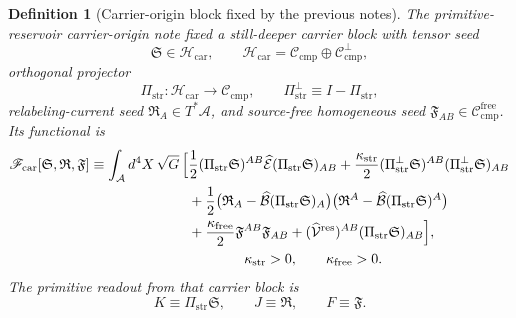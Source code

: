\documentclass[11pt]{article}
\newcommand{\Sub}{\mathcal A}
\newcommand{\ResidualLift}{\widehat{\mathcal V}^{\mathrm{res}}}
\newcommand{\SubEinLin}{\widehat{\mathcal E}}
\newcommand{\SubGaugeVec}{\widehat{\mathcal B}}
\newcommand{\CompClass}{\mathscr C_{\mathrm{cmp}}}
\newcommand{\CompFree}{\mathscr C_{\mathrm{cmp}}^{\mathrm{free}}}
\newcommand{\CarrierFunctional}{\mathscr F_{\mathrm{car}}}
\newcommand{\FreeStiff}{\kappa_{\mathrm{free}}}
\newcommand{\PrimStrain}{K}
\newcommand{\PrimNeutral}{J}
\newcommand{\PrimFree}{F}
\newcommand{\CarrierClass}{\mathscr H_{\mathrm{car}}}
\newcommand{\CarrierProj}{\Pi_{\mathrm{str}}}
\newcommand{\CarrierPerp}{\Pi_{\mathrm{str}}^{\perp}}
\newcommand{\CarrierGap}{\kappa_{\mathrm{str}}}
\newcommand{\CarrierSeed}{\mathfrak S}
\newcommand{\RelabelSeed}{\mathfrak R}
\newcommand{\FreeSeed}{\mathfrak F}
\newtheorem{definition}{Definition}
\begin{document}
\begin{definition}[Carrier-origin block fixed by the previous notes]
\label{def:carrier}
The primitive-reservoir carrier-origin note fixed a still-deeper carrier block with tensor seed
\[
\CarrierSeed\in\CarrierClass,
\qquad
\CarrierClass=\CompClass\oplus \CompClass^\perp,
\]
orthogonal projector
\[
\CarrierProj:\CarrierClass\to\CompClass,
\qquad
\CarrierPerp\equiv I-\CarrierProj,
\]
relabeling-current seed \(\RelabelSeed_A\in T^*\Sub\), and source-free homogeneous seed \(\FreeSeed_{AB}\in\CompFree\). Its functional is
\begin{equation}
\begin{aligned}
\CarrierFunctional[\CarrierSeed,\RelabelSeed,\FreeSeed]
\equiv
\int_{\Sub} d^4X\,\sqrt{G}\,
\Bigl[
&\frac12 (\CarrierProj\CarrierSeed)^{AB}
\SubEinLin(\CarrierProj\CarrierSeed)_{AB}
+\frac{\CarrierGap}{2}(\CarrierPerp\CarrierSeed)^{AB}(\CarrierPerp\CarrierSeed)_{AB}
\\
&+\frac12\bigl(\RelabelSeed_A-\SubGaugeVec(\CarrierProj\CarrierSeed)_A\bigr)
\bigl(\RelabelSeed^A-\SubGaugeVec(\CarrierProj\CarrierSeed)^A\bigr)
\\
&+\frac{\FreeStiff}{2}\FreeSeed^{AB}\FreeSeed_{AB}
+(\ResidualLift)^{AB}(\CarrierProj\CarrierSeed)_{AB}
\Bigr],
\\
&\qquad\qquad \CarrierGap>0,\qquad \FreeStiff>0.
\end{aligned}
\label{eq:car}
\end{equation}
The primitive readout from that carrier block is
\begin{equation}
\PrimStrain\equiv \CarrierProj\CarrierSeed,
\qquad
\PrimNeutral\equiv \RelabelSeed,
\qquad
\PrimFree\equiv \FreeSeed.
\label{eq:readout}
\end{equation}
\end{definition}
\end{document}
